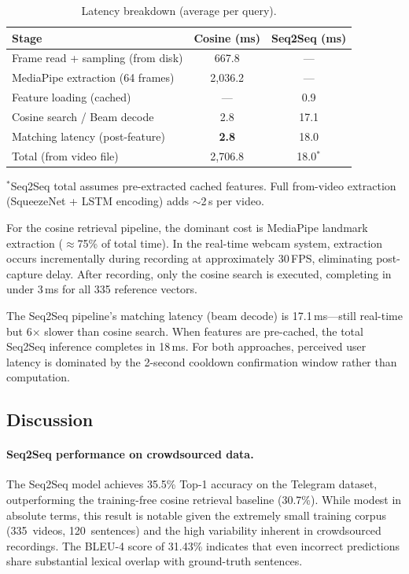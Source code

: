 \documentclass[runningheads]{llncs}
\begin{document}
\begin{table}[t]
\centering
\caption{Latency breakdown (average per query).}
\label{tab:latency}
\begin{tabular}{@{}lcc@{}}
\toprule
Stage & Cosine (ms) & Seq2Seq (ms) \\
\midrule
Frame read + sampling (from disk) & 667.8 & --- \\
MediaPipe extraction (64 frames)  & 2{,}036.2 & --- \\
Feature loading (cached)          & ---  & 0.9 \\
Cosine search / Beam decode       & 2.8  & 17.1 \\
\midrule
Matching latency (post-feature)   & \textbf{2.8} & 18.0 \\
Total (from video file)           & 2{,}706.8 & 18.0$^*$ \\
\bottomrule
\end{tabular}
\par\smallskip
\footnotesize{$^*$Seq2Seq total assumes pre-extracted cached features.
Full from-video extraction (SqueezeNet + LSTM encoding) adds
$\sim$2\,s per video.}
\end{table}

For the cosine retrieval pipeline, the dominant cost is MediaPipe
landmark extraction ($\approx$75\% of total time).
In the real-time webcam system, extraction occurs incrementally during
recording at approximately 30\,FPS, eliminating post-capture delay.
After recording, only the cosine search is executed, completing in under
3\,ms for all 335 reference vectors.

The Seq2Seq pipeline's matching latency (beam decode) is 17.1\,ms—still
real-time but 6$\times$ slower than cosine search.
When features are pre-cached, the total Seq2Seq inference completes in
18\,ms.
For both approaches, perceived user latency is dominated by the
2-second cooldown confirmation window rather than computation.

\subsection{Discussion}\label{sec:discussion}

\paragraph{Seq2Seq performance on crowdsourced data.}
The Seq2Seq model achieves 35.5\% Top-1 accuracy on the Telegram
dataset, outperforming the training-free cosine retrieval baseline
(30.7\%).
While modest in absolute terms, this result is notable given the
extremely small training corpus (335~videos, 120~sentences) and the
high variability inherent in crowdsourced recordings.
The BLEU-4 score of 31.43\% indicates that even incorrect
predictions share substantial lexical overlap with ground-truth
sentences.
\end{document}
